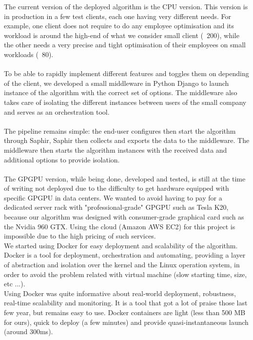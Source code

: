 \documentclass[12pt]{memoir}
\begin{document}
The current version of the deployed algorithm is the CPU version. This version is in
production in a few test clients, each one having very different needs. For example,
one client does not require to do any employee optimisation and its workload is
around the high-end of what we consider small client (~200), while the other needs a
very precise and tight optimisation of their employees on small workloads (~80).\\
\\
To be able to rapidly implement different features and toggles them on depending of the client,
we developed a small middleware in Python Django to launch instance of the algorithm
with the correct set of options. The middleware also takes care of isolating the
different instances between users of the small company and serves as an orchestration
tool.\\
\\
The pipeline remains simple: the end-user configures then start the algorithm through
Saphir, Saphir then collects and exports the data to the middleware. The middleware
then starts the algorithm instances with the received data and additional options to
provide isolation.\\
\\
The GPGPU version, while being done, developed and tested, is still at the time of
writing not deployed due to the difficulty to get hardware equipped with specific
GPGPU in data centers. We wanted to avoid having to pay for a dedicated server rack
with "professional-grade" GPGPU such as Tesla K20, because our algorithm was
designed with consumer-grade graphical card such as the Nvidia 960 GTX. Using the
cloud (Amazon AWS EC2) for this project is impossible due to the high pricing
of such services.
\\
We started using Docker for easy deployment and scalability of the algorithm. Docker
is a tool for deployment, orchestration and automating, providing a layer of
abstraction and isolation over the kernel and the Linux operation system, in order
to avoid the problem related with virtual machine (slow starting time, size, etc
...). \\
Using Docker was quite informative about real-world deployment, robustness,
real-time scalability and monitoring. It is a tool that got a lot of praise those
last few year, but remains easy to use. Docker containers are light (less than 500
MB for ours), quick to deploy (a few minutes) and provide quasi-instantaneous launch
(around 300ms).
\end{document}

